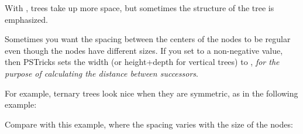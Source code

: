 \documentclass[fontsize=11pt,english,BCOR=10mm,DIV=12,bibliography=totoc,parskip=false,
   headings=small, headinclude=false,footinclude=false,oneside]{pst-doc}
\begin{document}
With , trees take up more space, but sometimes the structure
of the tree is emphasized.




Sometimes you want the spacing between the centers of the nodes to be regular
even though the nodes have different sizes. If you set 
to a non-negative value, then PSTricks sets the width (or height+depth for
vertical trees) to , \emph{for the purpose of calculating the
distance between successors}.


For example, ternary trees look nice when they are symmetric, as in the
following example:

\begin{LTXexample}[pos=l,width=0.4\linewidth]
\end{LTXexample}

Compare with this example, where the spacing varies with the size of the
nodes:

\begin{LTXexample}[pos=l,width=0.4\linewidth]
\end{LTXexample}
\end{document}
